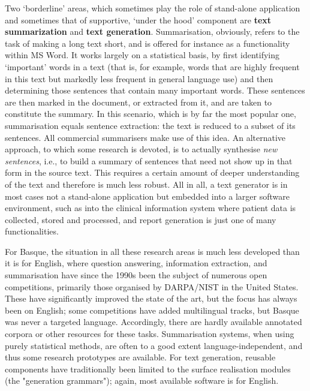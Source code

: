 \begin{multicols}{2}
Two ‘borderline’ areas, which sometimes play the role of stand-alone application and sometimes that of supportive, ‘under the hood’ component are \textbf{text summariza\-tion} and \textbf{text generation}. Summarisation, obviously, refers to the task of making a long text short, and is offered for instance as a functionality within MS Word. It works largely on a statistical basis, by first identifying ‘important’ words in a text (that is, for example, words that are highly frequent in this text but markedly less frequent in general language use) and then determining those sentences that contain many important words. These sentences are then marked in the document, or extracted from it, and are taken to constitute the summary. In this scenario, which is by far the most popular one, summarisation equals sentence extraction: the text is reduced to a subset of its sentences. All commercial summarisers make use of this idea. An alternative approach, to which some research is devoted, is to actually synthesise \textit{new sentences}, i.e., to build a summary of sentences that need not show up in that form in the source text. This requires a certain amount of deeper understanding of the text and therefore is much less robust. All in all, a text generator is in most cases not a stand-alone application but embedded into a larger software environment, such as into the clinical information system where patient data is collected, stored and processed, and report generation is just one of many functionalities.


For Basque, the situation in all these research areas is much less developed than it is for English, where question answering, information extraction, and summarisation have since the 1990s been the subject of numerous open competitions, primarily those organised by DARPA/NIST in the United States. These have significantly improved the state of the art, but the focus has always been on English; some competitions have added multilingual tracks, but Basque was never a targeted language. Accordingly, there are hardly available annotated corpora or other resources for these tasks. Summarisation systems, when using purely statistical methods, are often to a good extent language-independent, and thus some research prototypes are available. For text generation, reusable components have traditionally been limited to the surface realisation modules (the "generation grammars"); again, most available software is for English.


\end{multicols}
